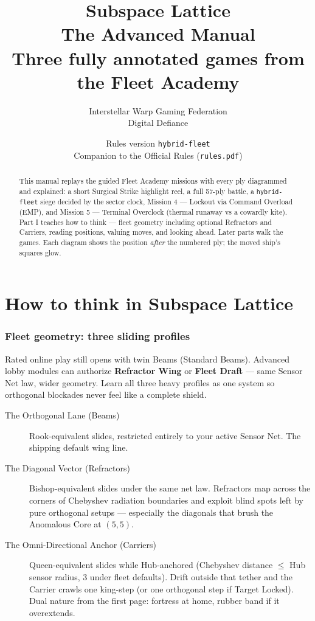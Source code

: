 \documentclass[11pt,a4paper]{article}
\title{Subspace Lattice\\[0.4em]\large The Advanced Manual\\
\normalsize Three fully annotated games from the Fleet Academy}
\author{Interstellar Warp Gaming Federation \\ Digital Defiance}
\date{Rules version \texttt{hybrid-fleet} \\ Companion to the Official Rules (\texttt{rules.pdf})}
\begin{document}
\maketitle

\begin{abstract}
\noindent
This manual replays the guided Fleet Academy missions with every ply
diagrammed and explained: a short Surgical Strike highlight reel, a full
57-ply battle, a \texttt{hybrid-fleet} siege decided by the sector clock,
Mission 4 --- Lockout via Command Overload (EMP), and Mission 5 --- Terminal
Overclock (thermal runaway vs a cowardly kite). Part I teaches how to think
--- fleet geometry including optional Refractors and Carriers, reading
positions, valuing moves, and looking ahead. Later parts walk the games. Each
diagram shows the position \emph{after} the numbered ply; the moved ship's
squares glow.
\end{abstract}

\tableofcontents
\clearpage

\part{How to think in Subspace Lattice}

\section{Fleet geometry: three sliding profiles}

Rated online play still opens with twin Beams (Standard Beams). Advanced lobby
modules can authorize \textbf{Refractor Wing} or \textbf{Fleet Draft} --- same
Sensor Net law, wider geometry. Learn all three heavy profiles as one system so
orthogonal blockades never feel like a complete shield.

\begin{description}
  \item[The Orthogonal Lane (Beams)] Rook-equivalent slides, restricted
        entirely to your active Sensor Net. The shipping default wing line.
  \item[The Diagonal Vector (Refractors)] Bishop-equivalent slides under the
        same net law. Refractors map across the corners of Chebyshev radiation
        boundaries and exploit blind spots left by pure orthogonal setups ---
        especially the diagonals that brush the Anomalous Core at $(5,5)$.
  \item[The Omni-Directional Anchor (Carriers)] Queen-equivalent slides while
        Hub-anchored (Chebyshev distance $\le$ Hub sensor radius, $3$ under
        fleet defaults). Drift outside that tether and the Carrier crawls one
        king-step (or one orthogonal step if Target Locked). Dual nature from
        the first page: fortress at home, rubber band if it overextends.
\end{description}
\end{document}
